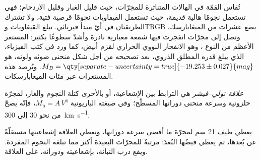 تُقاس القمّة في الهالات المتناثرة للمجرّات، حيث
قليل الغبار وقليل الازدحام؛ فهي تستعمل نجومًا هالية قديمة، حيث تستعمل القيفاويات
نجومًا قرصية فتية، ولا تشترك الطريقتان في أيّ مبدأ فيزيائي. تبلغ القيفاويات
وTRGB بضع عشرات من الميغابارسك، وتصل إلى مجرّات انفجرت فيها شمعة معيارية نادرة
وأشدّ سطوعًا بكثير: المستعر الأعظم من النوع ، وهو
الانفجار النووي الحراري لقزم أبيض، كما ورد في كتب الفيزياء،
الذي يبلغ قدره المطلق الذروي، بعد تصحيحه من أجل
شكل منحنى ضوئه ولونه، هو
$M_B = \qty[separate-uncertainty=true]{-19.253 \pm 0.027}{mag}$. وتُرصد هذه
المستعرات عبر مئات الميغابارسكات.

\begin{definition}\label{def:b3:milky-way-galaxies:tully-fisher}
\emph{علاقة تولي--فيشر} هي
الترابط بين الإشعاعية، أو بالأحرى كتلة النجوم والغاز،
لمجرّة حلزونية وسرعة منحنى دورانها المسطّح؛ وفي صيغته
الباريونية $M_\mathrm{b} = A\,V^4$، فإنّه يصحّ من نحو 30 إلى
\qty{300}{km.s^{-1}}.
\end{definition}

يعطي طيف 21 سم لمجرّة ما أقصى سرعة دورانها، وتعطي العلاقة
إشعاعيتها مستقلّةً عن بُعدها، ثم يعطي فيضُها البُعدَ:
مرتبةٌ للمجرّات  البعيدة أكثر مما تبلغه
النجوم المفردة. ويقع درب التبانة، بإشعاعيته ودورانه، على العلاقة.

